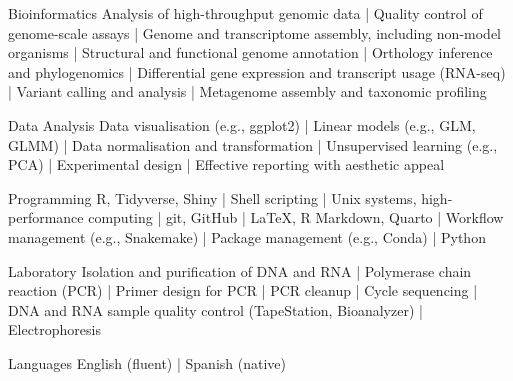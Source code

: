 {\color{awesome}\faCog}


\begin{cvskills}

  \cvskill
    {{\color{awesome}\faLaptopCode} Bioinformatics} %
    {Analysis of high-throughput genomic data |
    Quality control of genome-scale assays |
    Genome and transcriptome assembly, including non-model organisms |
    Structural and functional genome  annotation |
    Orthology inference and phylogenomics |
    Differential gene expression and transcript usage (RNA-seq) |
    Variant calling and analysis |
    Metagenome assembly and taxonomic profiling} %

  \cvskill
    {{\color{awesome}\faChartArea} Data Analysis} %
    {Data visualisation (e.g., ggplot2) |
    Linear models (e.g., GLM, GLMM) |
    Data normalisation and transformation |
    Unsupervised learning (e.g., PCA) |
    Experimental design |
    Effective reporting with aesthetic appeal} %

  \cvskill
    {{\color{awesome}\faCode} Programming} %
    {R, Tidyverse, Shiny |
    Shell scripting |
    Unix systems, high-performance computing |
    git, GitHub |
    LaTeX, R Markdown, Quarto |
    Workflow management (e.g., Snakemake) |
    Package management (e.g., Conda) |
    Python} %

  \cvskill
    {{\color{awesome}\faDna} Laboratory} %
    {Isolation and purification of DNA and RNA | 
    Polymerase chain reaction (PCR) | Primer design for PCR | 
    PCR cleanup | Cycle sequencing | 
    DNA and RNA sample quality control (TapeStation, Bioanalyzer) | 
    Electrophoresis} %

  \cvskill
    {{\color{awesome}\faLanguage} Languages} %
    {English (fluent) | Spanish (native)} %

\end{cvskills}